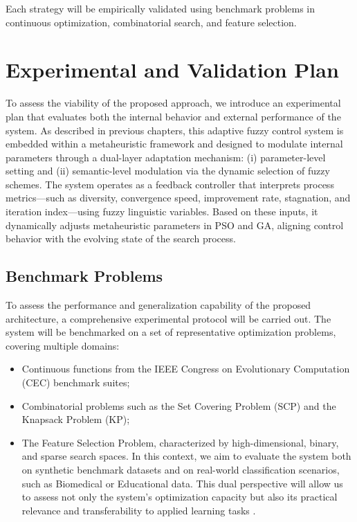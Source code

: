Each strategy will be empirically validated using benchmark problems in continuous optimization, combinatorial search, and feature selection.

\section{Experimental and Validation Plan}
To assess the viability of the proposed approach, we introduce an experimental plan that evaluates both the internal behavior and external performance of the system. As described in previous chapters, this adaptive fuzzy control system is embedded within a metaheuristic framework and designed to modulate internal parameters through a dual-layer adaptation mechanism: (i) parameter-level setting and (ii) semantic-level modulation via the dynamic selection of fuzzy schemes. The system operates as a feedback controller that interprets process metrics—such as diversity, convergence speed, improvement rate, stagnation, and iteration index—using fuzzy linguistic variables. Based on these inputs, it dynamically adjusts metaheuristic parameters in PSO and GA, aligning control behavior with the evolving state of the search process.
\subsection{Benchmark Problems}

To assess the performance and generalization capability of the proposed architecture, a comprehensive experimental protocol will be carried out. The system will be benchmarked on a set of representative optimization problems, covering multiple domains:
\begin{itemize}
    \item Continuous functions from the IEEE Congress on Evolutionary Computation (CEC) benchmark suites;
    \item Combinatorial problems such as the Set Covering Problem (SCP) and the Knapsack Problem (KP);
    \item The Feature Selection Problem, characterized by high-dimensional, binary, and sparse search spaces. In this context, we aim to evaluate the system both on synthetic benchmark datasets and on real-world classification scenarios, such as Biomedical or Educational data. This dual perspective will allow us to assess not only the system’s optimization capacity but also its practical relevance and transferability to applied learning tasks \parencite{cisternas2025application, barrera2023feature}.
\end{itemize}
